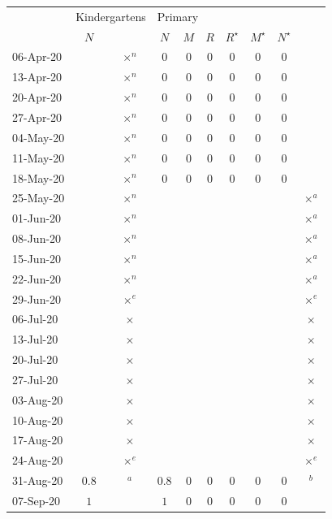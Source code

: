 \documentclass[fleqn,10pt]{wlscirep}
\begin{document}
\begin{table}
\begin{center}
{
			\tiny																						\begin{tabular}{l|cc|ccccccc}											
& \multicolumn{2}{l|}{Kindergartens} & \multicolumn{7}{l}{Primary} \\											
	&$N$	&		&$N$	&$M$	&$R$	&$R^\star$	&$M^\star$	&$N^\star$	&	\\
06-Apr-20	&	&$\times^{n}$		&$0$	&$0$	&$0$	&$0$	&$0$	&$0$	&	\\
13-Apr-20	&	&$\times^{n}$		&$0$	&$0$	&$0$	&$0$	&$0$	&$0$	&	\\
20-Apr-20	&	&$\times^{n}$		&$0$	&$0$	&$0$	&$0$	&$0$	&$0$	&	\\
27-Apr-20	&	&$\times^{n}$		&$0$	&$0$	&$0$	&$0$	&$0$	&$0$	&	\\
04-May-20	&	&$\times^{n}$		&$0$	&$0$	&$0$	&$0$	&$0$	&$0$	&	\\
11-May-20	&	&$\times^{n}$		&$0$	&$0$	&$0$	&$0$	&$0$	&$0$	&	\\
18-May-20	&	&$\times^{n}$		&$0$	&$0$	&$0$	&$0$	&$0$	&$0$	&	\\
25-May-20	&	&$\times^{n}$		&	&	&	&	&	&	&$\times^{a}$	\\
01-Jun-20	&	&$\times^{n}$		&	&	&	&	&	&	&$\times^{a}$	\\
08-Jun-20	&	&$\times^{n}$		&	&	&	&	&	&	&$\times^{a}$	\\
15-Jun-20	&	&$\times^{n}$		&	&	&	&	&	&	&$\times^{a}$	\\
22-Jun-20	&	&$\times^{n}$		&	&	&	&	&	&	&$\times^{a}$	\\
29-Jun-20	&	&$\times^{e}$		&	&	&	&	&	&	&$\times^{e}$	\\
06-Jul-20	&	&$\times$		&	&	&	&	&	&	&$\times$	\\
13-Jul-20	&	&$\times$		&	&	&	&	&	&	&$\times$	\\
20-Jul-20	&	&$\times$		&	&	&	&	&	&	&$\times$	\\
27-Jul-20	&	&$\times$		&	&	&	&	&	&	&$\times$	\\
03-Aug-20	&	&$\times$		&	&	&	&	&	&	&$\times$	\\
10-Aug-20	&	&$\times$		&	&	&	&	&	&	&$\times$	\\
17-Aug-20	&	&$\times$		&	&	&	&	&	&	&$\times$	\\
24-Aug-20	&	&$\times^{e}$		&	&	&	&	&	&	&$\times^{e}$	\\
31-Aug-20	&$0.8$	&$^{a}$		&$0.8$	&$0$	&$0$	&$0$	&$0$	&$0$	&$^{b}$	\\
07-Sep-20	&$1$	&		&$1$	&$0$	&$0$	&$0$	&$0$	&$0$	&	\\

\end{tabular}}
\end{center}
\end{table}
\end{document}
